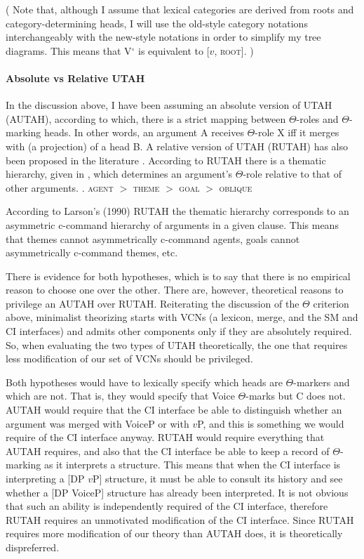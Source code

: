 \documentclass[letterpaper,12pt]{article}
\begin{document}
(
Note that, although I assume that lexical categories are derived from roots and category-determining heads, I will use the old-style category notations interchangeably with the new-style notations in order to simplify my tree diagrams.
This means that V$^\circ$ is equivalent to [$v$, \textsc{root}].
)

\paragraph{Absolute vs Relative UTAH}
In the discussion above, I have been assuming an absolute version of UTAH (AUTAH), according to which, there is a strict mapping between $\Theta$-roles and $\Theta$-marking heads.
In other words, an argument A receives $\Theta$-role X iff it merges with (a projection) of a head B.
A relative version of UTAH (RUTAH) has also been proposed in the literature \parencite[][\textit{inter alia}]{larson1990double}.
According to RUTAH there is a thematic hierarchy, given in \Next, which determines an argument's $\Theta$-role relative to that of other arguments.
\ex. \textsc{agent} $>$ \textsc{theme} $>$ \textsc{goal} $>$ \textsc{oblique} \parencite{larson1990double}

According to Larson's (1990) RUTAH the thematic hierarchy corresponds to an asymmetric c-command hierarchy of arguments in a given clause.
This means that themes cannot asymmetrically c-command agents, goals cannot asymmetrically c-command themes, etc.

There is evidence for both hypotheses, which is to say that there is no empirical reason to choose one over the other.
There are, however, theoretical reasons to privilege an AUTAH over RUTAH.
Reiterating the discussion of the $\Theta$ criterion above, minimalist theorizing starts with VCNs (a lexicon, merge, and the SM and CI interfaces) and admits other components only if they are absolutely required.
So, when evaluating the two types of UTAH theoretically, the one that requires less modification of our set of VCNs should be privileged.

Both hypotheses would have to lexically specify which heads are $\Theta$-markers and which are not.
That is, they would specify that Voice $\Theta$-marks but C does not.
AUTAH would require that the CI interface be able to distinguish whether an argument was merged with VoiceP or with $v$P, and this is something we would require of the CI interface anyway.
RUTAH would require everything that AUTAH requires, and also that the CI interface be able to keep a record of $\Theta$-marking as it interprets a structure.
This means that when the CI interface is interpreting a [DP $v$P] structure, it must be able to consult its history and see whether a [DP VoiceP] structure has already been interpreted.
It is not obvious that such an ability is independently required of the CI interface, therefore RUTAH requires an unmotivated modification of the CI interface.
Since RUTAH requires more modification of our theory than AUTAH does, it is theoretically dispreferred.
\end{document}
